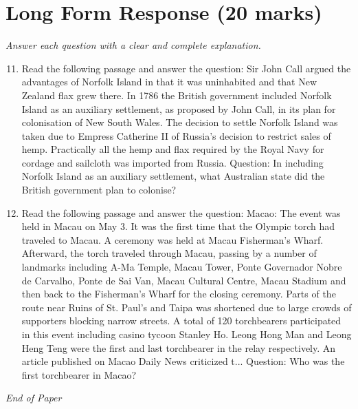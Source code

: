 \documentclass[12pt]{article}
\begin{document}
\section*{Long Form Response (20 marks)}
\textit{Answer each question with a clear and complete explanation.}
\begin{enumerate}[label=\arabic*.]
\setcounter{enumi}{10}
\item Read the following passage and answer the question: Sir John Call argued the advantages of Norfolk Island in that it was uninhabited and that New Zealand flax grew there. In 1786 the British government included Norfolk Island as an auxiliary settlement, as proposed by John Call, in its plan for colonisation of New South Wales. The decision to settle Norfolk Island was taken due to Empress Catherine II of Russia's decision to restrict sales of hemp. Practically all the hemp and flax required by the Royal Navy for cordage and sailcloth was imported from Russia. Question: In including Norfolk Island as an auxiliary settlement, what Australian state did the British government plan to colonise?
\item Read the following passage and answer the question: Macao: The event was held in Macau on May 3. It was the first time that the Olympic torch had traveled to Macau. A ceremony was held at Macau Fisherman's Wharf. Afterward, the torch traveled through Macau, passing by a number of landmarks including A-Ma Temple, Macau Tower, Ponte Governador Nobre de Carvalho, Ponte de Sai Van, Macau Cultural Centre, Macau Stadium and then back to the Fisherman's Wharf for the closing ceremony. Parts of the route near Ruins of St. Paul's and Taipa was shortened due to large crowds of supporters blocking narrow streets. A total of 120 torchbearers participated in this event including casino tycoon Stanley Ho. Leong Hong Man and Leong Heng Teng were the first and last torchbearer in the relay respectively. An article published on Macao Daily News criticized t... Question: Who was the first torchbearer in Macao?
\end{enumerate}

\vfill
\noindent\textit{End of Paper}
\end{document}
